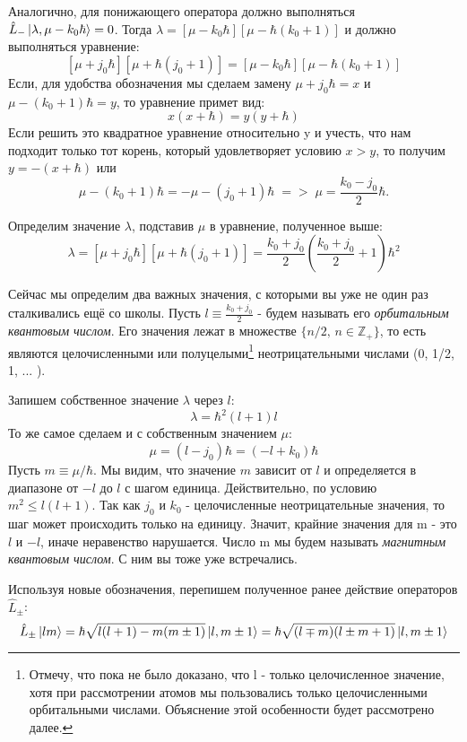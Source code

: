 Аналогично, для понижающего оператора должно выполняться $\hat{L}_-\ket{\lambda,\mu - k_0\hbar} = 0$. Тогда $\lambda = [\mu - k_0\hbar][\mu-\hbar(k_0 + 1)]$ и должно выполняться уравнение:
\[
 [\mu + j_0\hbar][\mu + \hbar(j_0 + 1)]=[\mu - k_0\hbar][\mu-\hbar(k_0 + 1)]
\]
Если, для удобства обозначения мы сделаем замену $\mu + j_0\hbar = x$ и $\mu - (k_0 + 1)\hbar = y$, то уравнение примет вид:
\[
x(x+\hbar) = y(y+\hbar)
\]
Если решить это квадратное уравнение относительно y и учесть, что нам подходит только тот корень, который удовлетворяет условию $x > y$, то получим $y = -(x + \hbar)$ или 
\[
\mu - (k_0 + 1)\hbar = -\mu - (j_0 + 1)\hbar\; => \; \mu = \frac{k_0 - j_0}{2}\hbar.
\]

Определим значение $\lambda$, подставив $\mu$ в уравнение, полученное выше:
\[
\lambda = [\mu + j_0\hbar][\mu + \hbar(j_0+1)] = \frac{k_0 + j_0}{2}\left(\frac{k_0 + j_0}{2} + 1\right)\hbar^2
\]

Сейчас мы определим два важных значения, с которыми вы уже не один раз сталкивались ещё со школы. Пусть $l\equiv \frac{k_0 + j_0}{2}$ - будем называть его \textit{орбитальным квантовым числом}. Его значения лежат в множестве $\{n/2,\, n\in \mathbb{Z}_+\}$, то есть являются целочисленными или полуцелыми\footnote[1]{Отмечу, что пока не было доказано, что l - только целочисленное значение, хотя при рассмотрении атомов мы пользовались только целочисленными орбитальными числами. Объяснение этой особенности будет рассмотрено далее.} неотрицательными числами (0, 1/2, 1, ... ).

Запишем собственное значение $\lambda$  через $l$:
\[
\lambda = \hbar^2(l+1)l
\]
То же самое сделаем и с собственным значением $\mu$:
\[
\mu = (l - j_0)\hbar = (-l + k_0)\hbar
\]
Пусть $m \equiv \mu/\hbar$. Мы видим, что значение $m$ зависит от $l$ и определяется в диапазоне от $-l$ до $l$ с шагом единица. Действительно, по условию $m^2 \leq l(l+1)$. Так как $j_0$ и $k_0$ - целочисленные неотрицательные значения, то шаг может происходить только на единицу. Значит, крайние значения для m - это $l$ и $-l$, иначе неравенство нарушается. Число m мы будем называть \textit{магнитным квантовым числом}. С ним вы тоже уже встречались.

Используя новые обозначения, перепишем полученное ранее действие операторов $\hat{L}_{\pm}$:
\[
\hat{L}_{\pm}\ket{lm} = \hbar\sqrt{l(l+1) - m(m \pm 1)}\ket{l, m \pm 1} = \hbar\sqrt{(l \mp m)(l \pm m + 1)}\ket{l,m\pm 1}
\]

